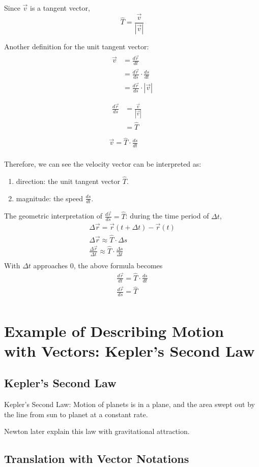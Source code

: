 \documentclass{article}
\begin{document}
Since $\vec{v}$ is a tangent vector,
\begin{equation*}
  \hat{T} = \frac{\vec{v}}{|\vec{v}|}
\end{equation*}

Another definition for the unit tangent vector:
\begin{gather*}
  \begin{split}
    \vec{v} &= \frac{d\vec{r}}{dt} \\
            &= \frac{d\vec{r}}{ds} \cdot \frac{ds}{dt} \\
            &= \frac{d\vec{r}}{ds} \cdot |\vec{v}| \\
  \end{split} \\
  \begin{split}
    \frac{d\vec{r}}{ds} &= \frac{\vec{v}}{|\vec{v}|} \\
                        &= \hat{T} \\
  \end{split} \\
  \vec{v} = \hat{T} \cdot \frac{ds}{dt} \\
\end{gather*}

Therefore, we can see the velocity vector can be interpreted as:
\begin{enumerate}
  \item direction: the unit tangent vector $\hat{T}$.
  \item magnitude: the speed $\frac{ds}{dt}$.
\end{enumerate}

The geometric interpretation of $\frac{d\vec{r}}{ds} = \hat{T}$: during the time 
period of $\Delta t$, 
\begin{gather*}
  \Delta \vec{r} = \vec{r}(t + \Delta t) - \vec{r}(t) \\
  \Delta \vec{r} \approx \hat{T} \cdot \Delta s \\
  \frac{\Delta \vec{r}}{\Delta t} \approx \hat{T} \cdot \frac{\Delta s}{\Delta t} \\
\end{gather*}
With $\Delta t$ approaches 0, the above formula becomes
\begin{gather*}
  \frac{d\vec{r}}{dt} = \hat{T} \cdot \frac{ds}{dt} \\
  \frac{d\vec{r}}{ds} = \hat{T} \\
\end{gather*}

\section{Example of Describing Motion with Vectors: Kepler's Second Law}

\subsection{Kepler's Second Law}

Kepler's Second Law: Motion of planets is in a plane, and the area swept out by 
the line from sun to planet at a constant rate.

Newton later explain this law with gravitational attraction.

\subsection{Translation with Vector Notations}
\end{document}

